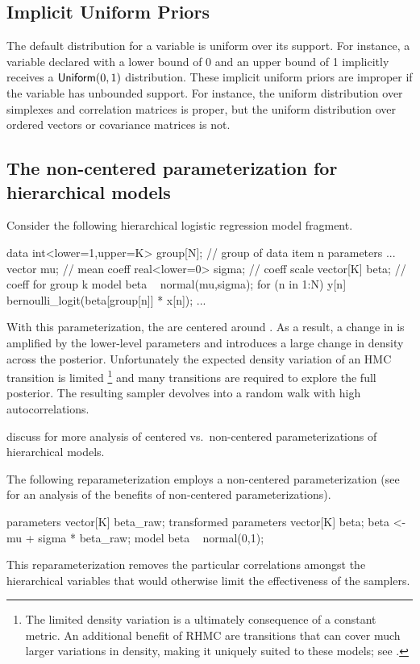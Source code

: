 \documentclass[article]{jss}
\begin{document}
\subsection{Implicit Uniform Priors}\label{implicit-prior.section}

The default distribution for a variable is uniform over its support.
For instance, a variable declared with a lower bound of 0 and an upper
bound of 1 implicitly receives a $\mbox{\sf Uniform}(0,1)$
distribution.  These implicit uniform priors are improper if the
variable has unbounded support.  For instance, the uniform
distribution over simplexes and correlation matrices is proper, but
the uniform distribution over ordered vectors or covariance matrices
is not. 

\subsection{The non-centered parameterization for hierarchical models}

Consider the following hierarchical logistic regression model fragment.
%
\begin{Code}
data {
  int<lower=1,upper=K> group[N];  // group of data item n
}  
parameters {
  ...
  vector mu;             // mean coeff
  real<lower=0> sigma;   // coeff scale
  vector[K] beta;        // coeff for group k
}
model {
  beta ~ normal(mu,sigma);
  for (n in 1:N)
    y[n] ~ bernoulli_logit(beta[group[n]] * x[n]);
  ...
}
\end{Code}
%
With this parameterization, the  are centered around
.  As a result, a change in  is amplified by the
lower-level parameters and introduces a large change in density across
the posterior.  Unfortunately the expected density variation of an HMC
transition is limited%
%
\footnote{The limited density variation is a ultimately consequence of
  a constant metric.  An additional benefit of RHMC are transitions
  that can cover much larger variations in density, making it uniquely
  suited to these models; see \citep{Neal:2011}.}
%
and many transitions are required to explore the full posterior.  The
resulting sampler devolves into a random walk with high
autocorrelations. 

\cite{BetancourtGirolami:2013} discuss for more
analysis of centered vs.\ non-centered parameterizations of
hierarchical models.

The following reparameterization employs a non-centered
parameterization (see \citep{BetancourtGirolami:2013} for an analysis
of the benefits of non-centered parameterizations).
%
\begin{Code}
parameters {
  vector[K] beta_raw;    
}
transformed parameters {
  vector[K] beta;
  beta <- mu + sigma * beta_raw;
}
model {
  beta ~ normal(0,1);
}
\end{Code}
%
This reparameterization removes the particular correlations amongst the
hierarchical variables that would otherwise limit the effectiveness
of the samplers.
\end{document}
